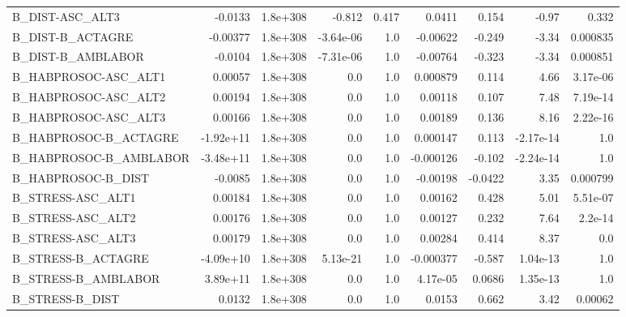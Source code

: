 \begin{tabular}{lrrrrrrrr}
B\_DIST-ASC\_ALT3               &     -0.0133 &     1.8e+308 &    -0.812 &    0.417 &     0.0411 &       0.154 &        -0.97 &         0.332 \\
B\_DIST-B\_ACTAGRE              &    -0.00377 &     1.8e+308 & -3.64e-06 &      1.0 &   -0.00622 &      -0.249 &        -3.34 &      0.000835 \\
B\_DIST-B\_AMBLABOR             &     -0.0104 &     1.8e+308 & -7.31e-06 &      1.0 &   -0.00764 &      -0.323 &        -3.34 &      0.000851 \\
B\_HABPROSOC-ASC\_ALT1          &     0.00057 &     1.8e+308 &       0.0 &      1.0 &   0.000879 &       0.114 &         4.66 &      3.17e-06 \\
B\_HABPROSOC-ASC\_ALT2          &     0.00194 &     1.8e+308 &       0.0 &      1.0 &    0.00118 &       0.107 &         7.48 &      7.19e-14 \\
B\_HABPROSOC-ASC\_ALT3          &     0.00166 &     1.8e+308 &       0.0 &      1.0 &    0.00189 &       0.136 &         8.16 &      2.22e-16 \\
B\_HABPROSOC-B\_ACTAGRE         &   -1.92e+11 &     1.8e+308 &       0.0 &      1.0 &   0.000147 &       0.113 &    -2.17e-14 &           1.0 \\
B\_HABPROSOC-B\_AMBLABOR        &   -3.48e+11 &     1.8e+308 &       0.0 &      1.0 &  -0.000126 &      -0.102 &    -2.24e-14 &           1.0 \\
B\_HABPROSOC-B\_DIST            &     -0.0085 &     1.8e+308 &       0.0 &      1.0 &   -0.00198 &     -0.0422 &         3.35 &      0.000799 \\
B\_STRESS-ASC\_ALT1             &     0.00184 &     1.8e+308 &       0.0 &      1.0 &    0.00162 &       0.428 &         5.01 &      5.51e-07 \\
B\_STRESS-ASC\_ALT2             &     0.00176 &     1.8e+308 &       0.0 &      1.0 &    0.00127 &       0.232 &         7.64 &       2.2e-14 \\
B\_STRESS-ASC\_ALT3             &     0.00179 &     1.8e+308 &       0.0 &      1.0 &    0.00284 &       0.414 &         8.37 &           0.0 \\
B\_STRESS-B\_ACTAGRE            &   -4.09e+10 &     1.8e+308 &  5.13e-21 &      1.0 &  -0.000377 &      -0.587 &     1.04e-13 &           1.0 \\
B\_STRESS-B\_AMBLABOR           &    3.89e+11 &     1.8e+308 &       0.0 &      1.0 &   4.17e-05 &      0.0686 &     1.35e-13 &           1.0 \\
B\_STRESS-B\_DIST               &      0.0132 &     1.8e+308 &       0.0 &      1.0 &     0.0153 &       0.662 &         3.42 &       0.00062 \\

\end{tabular}
